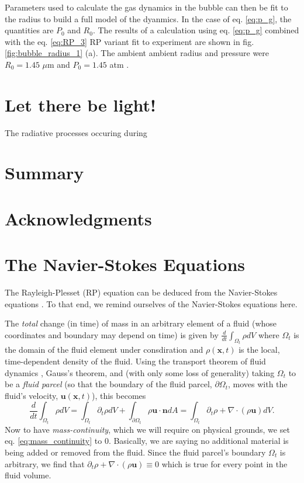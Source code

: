 \documentclass[rmp,aps,nofootinbib,superscriptaddress,floatfix]{revtex4-2}
\begin{document}
Parameters used to calculate the gas dynamics in the bubble can then be fit to the radius to build a full model of the dyanmics. In the case of eq. \ref{eq:p_g}, the quantities are $P_0$ and $R_0$. The results of a calculation using eq. \ref{eq:p_g} combined with the eq. \ref{eq:RP_3} RP variant fit to experiment are shown in fig. \ref{fig:bubble_radius_1} (a). The ambient ambient radius and pressure were $R_0=1.45$ $\mu$m and $P_0=1.45$ atm \cite{barber1997defining,barber1992light}.

\section{Let there be light!}
The radiative processes occuring during \cite{hilgenfeldt1999simple}

\section{Summary}

\section{Acknowledgments}

\appendix

\section{The Navier-Stokes Equations}
The Rayleigh-Plesset (RP) equation can be deduced from the Navier-Stokes equations \cite{prosperetti1999old,brenner2002single,prosperetti1986bubble,plesset1977bubble,suslick2008inside,yasui2018acoustic}. To that end, we remind ourselves of the Navier-Stokes equations here. 

The \emph{total} change (in time) of mass in an arbitrary element of a fluid (whose coordinates and boundary may depend on time) is given by  $\frac{d}{dt} \int_{\Omega_t} \rho dV$ where $\Omega_t$ is the domain of the fluid element under consdiration and $\rho(\bm{x},t)$ is the local, time-dependent density of the fluid. Using the transport theorem of fluid dynamics \cite{mcdonough2009lectures}, Gauss's theorem, and (with only some loss of generality) taking $\Omega_t$ to be a \emph{fluid parcel} (so that the boundary of the fluid parcel, $\partial \Omega_t$, moves with the fluid's velocity, $\bm{u}(\bm{x},t)$), this becomes
\begin{equation}
    \frac{d}{dt} \int_{\Omega_t} \rho dV = \int_{\Omega_t} \partial_t \rho dV+\int_{\partial \Omega_t} \rho \bm{u} \cdot \bm{n} dA = \int_{\Omega_t} \partial_t \rho+\nabla \cdot(\rho \bm{u})dV.
    \label{eq:mass_continuity}
\end{equation}
Now to have \emph{mass-continuity}, which we will require on physical grounds, we set eq. \ref{eq:mass_continuity} to 0. Basically, we are saying no additional material is being added or removed from the fluid. Since the fluid parcel's boundary $\Omega_t$ is arbitrary, we find that $\partial_t \rho+\nabla\cdot(\rho \bm{u})\equiv 0$ which is true for every point in the fluid volume.
\end{document}
